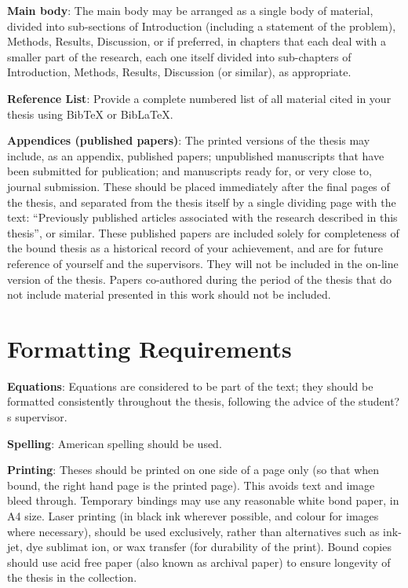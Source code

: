 \textbf{Main body}:  The main body may be arranged as a single body of material, divided into sub-sections of Introduction (including a statement of the problem), Methods, Results, Discussion, or if preferred, in chapters that each deal with a smaller part of the research, each one itself divided into sub-chapters of Introduction, Methods, Results, Discussion (or similar), as appropriate.

\textbf{Reference List}:  Provide a complete numbered list of all material cited in your thesis using BibTeX or BibLaTeX.

\textbf{Appendices (published papers)}: The printed versions of the thesis may include, as an appendix, published papers; unpublished manuscripts that have been submitted for publication; and manuscripts ready for, or very close to, journal submission.  These should be placed immediately after the final pages of the thesis, and separated from the thesis itself by a single dividing page with the text: ``Previously published articles associated with the research described in this thesis'', or similar. These published papers are included solely for completeness of the bound thesis as a historical record of your achievement, and are for future reference of yourself and the supervisors.  They will not be included in the on-line version of the thesis. Papers co-authored during the period of the thesis that do not include material presented in this work should not be included.

\section{Formatting Requirements}

\textbf{Equations}: Equations are considered to be part of the text; they should be formatted consistently throughout the thesis, following the advice of the student?s supervisor.

\textbf{Spelling}: American spelling should be used.

\textbf{Printing}:  Theses should be printed on one side of a page only (so that when bound, the right hand page is the printed page).  This avoids text and image bleed through.  Temporary bindings may use any reasonable white bond paper, in A4 size.  Laser printing (in black ink wherever possible, and colour for images where necessary), should be used exclusively, rather than alternatives such as ink-jet, dye sublimat ion, or wax transfer (for durability of the print).  Bound copies should use acid free paper (also known as archival paper) to ensure longevity of the thesis in the collection.

